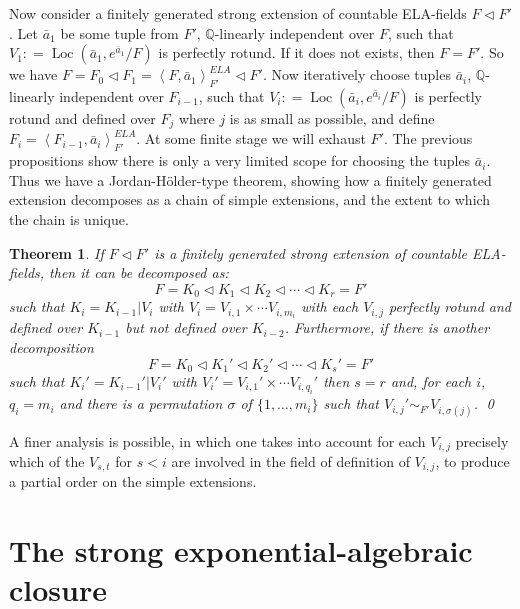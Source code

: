 \documentclass[12pt]{amsart}
\newtheorem{theorem}[prop]{Theorem}
\theoremstyle{definition}
\begin{document}
Now consider a finitely generated strong extension of countable ELA-fields $F {\ensuremath{\lhd}} F'$. Let ${{\ensuremath{\bar{a}}}}_1$ be some tuple from $F'$, ${\ensuremath{\mathbb{Q}}}$-linearly independent over $F$, such that $V_1 {\mathrel{\mathop:}=} \operatorname{Loc}({{\ensuremath{\bar{a}}}}_1,e^{{{\ensuremath{\bar{a}}}}_1}/F)$ is perfectly rotund. If it does not exists, then $F = F'$. So we have $F = F_0 {\ensuremath{\lhd}} F_1 = {\ensuremath{\left\langle {F,{{\ensuremath{\bar{a}}}}_1} \right\rangle}}^{ELA}_{F'} {\ensuremath{\lhd}} F'$. Now iteratively choose tuples ${{\ensuremath{\bar{a}}}}_i$, ${\ensuremath{\mathbb{Q}}}$-linearly independent over $F_{i-1}$, such that $V_i {\mathrel{\mathop:}=} \operatorname{Loc}({{\ensuremath{\bar{a}}}}_i,e^{{{\ensuremath{\bar{a}}}}_i}/F)$ is perfectly rotund and defined over $F_j$ where $j$ is as small as possible, and define $F_i = {\ensuremath{\left\langle {F_{i-1},{{\ensuremath{\bar{a}}}}_i} \right\rangle}}^{ELA}_{F'}$. At some finite stage we will exhaust $F'$. The previous propositions show there is only a very limited scope for choosing the tuples ${{\ensuremath{\bar{a}}}}_i$. Thus we have a Jordan-H\"older-type theorem, showing how a finitely generated extension decomposes as a chain of simple extensions, and the extent to which the chain is unique.
\begin{theorem}\label{Jordan-Holder}
If $F {\ensuremath{\lhd}} F'$ is a finitely generated strong extension of countable ELA-fields, then it can be decomposed as:
\[F = K_0 {\ensuremath{\lhd}} K_1 {\ensuremath{\lhd}} K_2 {\ensuremath{\lhd}} \cdots {\ensuremath{\lhd}} K_r = F'\]
such that $K_i = K_{i-1}|V_i$ with $V_i =  V_{i,1} {\ensuremath{\times}} \cdots V_{i,m_i}$
with each $V_{i,j}$ perfectly rotund and defined over $K_{i-1}$ but not defined over $K_{i-2}$. Furthermore, if there is another decomposition
\[F = K_0 {\ensuremath{\lhd}} K_1' {\ensuremath{\lhd}} K_2' {\ensuremath{\lhd}} \cdots {\ensuremath{\lhd}} K_s' = F'\]
such that $K_i' = K_{i-1}'|V_i'$ with $V_i' =  V_{i,1}' {\ensuremath{\times}} \cdots V_{i,q_i}'$
then $s=r$ and, for each $i$, $q_i = m_i$ and there is a permutation $\sigma$ of $\{1,\ldots,m_i\}$ such that $V_{i,j}' \sim_{F'} V_{i,\sigma(j)}$. \qed
\end{theorem}
A finer analysis is possible, in which one takes into account for each $V_{i,j}$ precisely which of the $V_{s,t}$ for $s<i$ are involved in the field of definition of $V_{i,j}$, to produce a partial order on the simple extensions.

\section{The strong exponential-algebraic closure}
\end{document}
